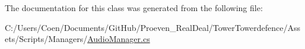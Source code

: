 The documentation for this class was generated from the following file\+:\begin{DoxyCompactItemize}
\item 
C\+:/\+Users/\+Coen/\+Documents/\+Git\+Hub/\+Proeven\+\_\+\+Real\+Deal/\+Tower\+Towerdefence/\+Assets/\+Scripts/\+Managers/\hyperlink{_audio_manager_8cs}{Audio\+Manager.\+cs}\end{DoxyCompactItemize}
